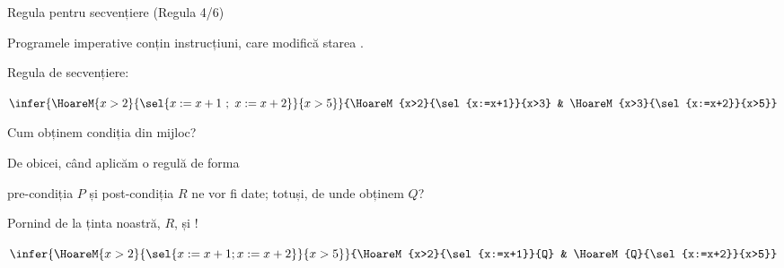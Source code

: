 \begin{frame}{Regula pentru secvențiere (Regula 4/6)}

Programele imperative conțin instrucțiuni, care modifică starea .

\alert{Regula de secvențiere:}
\begin{center}
\end{center}

\pause
\begin{example}
\begin{center}
$\infer{\HoareM{x>2}{\sel{x:=x+1\ ;\  x:=x+2}}{x>5}}{\HoareM{x>2}{\sel{x:=x+1}}{x>3} & \HoareM{x>3}{\sel{x:=x+2}}{x>5}}$
\end{center}

\end{example}
\end{frame}


\begin{frame}{Cum obținem condiția din mijloc?}

De obicei, când aplicăm o regulă de forma
\begin{center}
\end{center}
pre-condiția $P$ și post-condiția $R$ ne vor fi date; totuși, de unde obținem $Q$?

\pause
Pornind de la ținta noastră, $R$, și !

\begin{center}
$\infer{\HoareM{x>2}{\sel{x:=x+1 ; x:=x+2}}{x>5}}{\HoareM{x>2}{\sel{x:=x+1}}{Q} & \HoareM{Q}{\sel{x:=x+2}}{x>5}}$
\end{center}

\end{frame}

